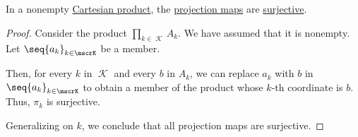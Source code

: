 \begin{proposition}\label{thm:cartesian_product_projection_surjective}
  In a nonempty \hyperref[def:cartesian_product]{Cartesian product}, the \hyperref[def:cartesian_product_projection]{projection maps} are \hyperref[def:function_invertibility/surjective]{surjective}.
\end{proposition}
\begin{proof}
  Consider the product \( \prod_{k \in \mscrK} A_k \). We have assumed that it is nonempty. Let \( \seq{ a_k }_{k \in \mscrK} \) be a member.

  Then, for every \( k \) in \( \mscrK \) and every \( b \) in \( A_k \), we can replace \( a_k \) with \( b \) in \( \seq{ a_k }_{k \in \mscrK} \) to obtain a member of the product whose \( k \)-th coordinate is \( b \). Thus, \( \pi_k \) is surjective.

  Generalizing on \( k \), we conclude that all projection maps are surjective.
\end{proof}


